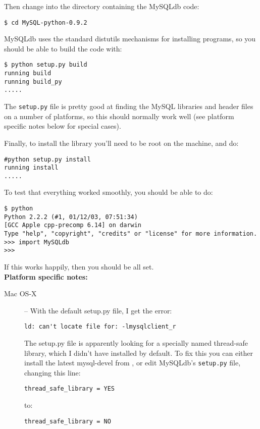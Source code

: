 \documentclass{article}
\begin{document}
Then change into the directory containing the MySQLdb code:

\begin{verbatim}
$ cd MySQL-python-0.9.2
\end{verbatim}

MySQLdb uses the standard distutils mechanisms for installing programs,
so you should be able to build the code with:

\begin{verbatim}
$ python setup.py build
running build
running build_py
.....
\end{verbatim}

The \verb|setup.py| file is pretty good at finding the MySQL libraries
and header files on a number of platforms, so this should normally work
well (see platform specific notes below for special cases).

Finally, to install the library you'll need to be root on the machine,
and do:

\begin{verbatim}
#python setup.py install
running install
.....
\end{verbatim}

To test that everything worked smoothly, you should be able to do:

\begin{verbatim}
$ python
Python 2.2.2 (#1, 01/12/03, 07:51:34) 
[GCC Apple cpp-precomp 6.14] on darwin
Type "help", "copyright", "credits" or "license" for more information.
>>> import MySQLdb
>>>
\end{verbatim}

If this works happily, then you should be all set.
\\


\textbf{\large Platform specific notes:}
\begin{description}
  \item[Mac OS-X] -- With the default setup.py file, I get the error:

  \verb|ld: can't locate file for: -lmysqlclient_r|
  
  The setup.py file
  is apparently looking for a specially named thread-safe library, which
  I didn't have installed by default. To fix this you can either
  install the latest mysql-devel from
  , or edit MySQLdb's
  \verb|setup.py| file, changing this line:

  \verb|thread_safe_library = YES|

  to:

  \verb|thread_safe_library = NO|
  
\end{description}
\end{document}
